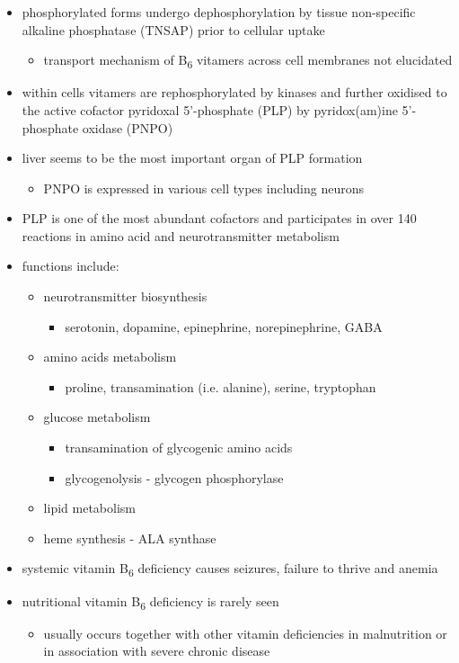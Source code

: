 \documentclass[12pt]{scrartcl}
\begin{document}
\begin{itemize}
\item phosphorylated forms undergo dephosphorylation by tissue
non-specific alkaline phosphatase (TNSAP) prior to cellular uptake
\begin{itemize}
\item transport mechanism of B\textsubscript{6} vitamers across cell membranes not
elucidated
\end{itemize}
\item within cells vitamers are rephosphorylated by kinases and further oxidised to the
active cofactor pyridoxal 5’-phosphate (PLP) by pyridox(am)ine
5’-phosphate oxidase (PNPO)
\item liver seems to be the most important organ of PLP formation
\begin{itemize}
\item PNPO is expressed in various cell types including neurons
\end{itemize}
\item PLP is one of the most abundant cofactors and participates in over
140 reactions in amino acid and neurotransmitter metabolism
\item functions include:
\begin{itemize}
\item neurotransmitter biosynthesis
\begin{itemize}
\item serotonin, dopamine, epinephrine, norepinephrine, GABA
\end{itemize}
\item amino acids metabolism
\begin{itemize}
\item proline, transamination (i.e. alanine), serine, tryptophan
\end{itemize}
\item glucose metabolism
\begin{itemize}
\item transamination of glycogenic amino acids
\item glycogenolysis - glycogen phosphorylase
\end{itemize}
\item lipid metabolism
\item heme synthesis - ALA synthase
\end{itemize}
\item systemic vitamin B\textsubscript{6} deficiency causes seizures, failure to thrive
and anemia
\item nutritional vitamin B\textsubscript{6} deficiency is rarely seen
\begin{itemize}
\item usually occurs together with other vitamin deficiencies in
malnutrition or in association with severe chronic disease
\end{itemize}
\end{itemize}
\end{document}
